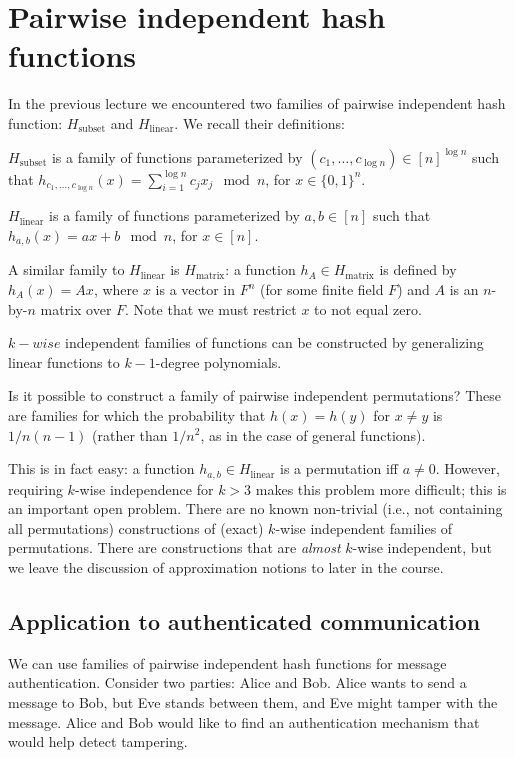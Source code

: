 \documentclass{article}
\begin{document}
\section{Pairwise independent hash functions}
In the previous lecture we encountered two families of pairwise
independent hash function: $H_{\mathrm{subset}}$ and
$H_{\mathrm{linear}}$. We recall their definitions:
\begin{definition}
  $H_{\mathrm{subset}}$ is a family of functions parameterized by
  $(c_1, \ldots, c_{\log n}) \in [n]^{\log n}$ such that $h_{c_1,
    \ldots, c_{\log n}}(x) = \sum_{i=1}^{\log n}c_jx_j \mod n$, for $x \in
    \{0,1\}^n$.
\end{definition}
\begin{definition}
  $H_{\mathrm{linear}}$ is a family of functions parameterized by
  $a,b \in [n]$ such that $h_{a,b}(x) = ax+b \mod n$, for $x \in [n]$.
\end{definition}

A similar family to $H_{\mathrm{linear}}$ is $H_{\mathrm{matrix}}$: a
function $h_A \in H_{\mathrm{matrix}}$ is defined by $h_A(x) = Ax$,
where $x$ is a vector in $F^n$ (for some finite field $F$) and $A$ is
an $n$-by-$n$ matrix over $F$. Note that we must restrict $x$ to not
equal zero.

$k-wise$ independent families of functions can be constructed by
generalizing linear functions to $k-1$-degree polynomials. 

Is it possible to construct a family of pairwise independent
permutations? These are families for which the probability that
$h(x)=h(y)$ for $x \neq y$ is $1/n(n-1)$ (rather than $1/n^2$, as in
the case of general functions).

This is in fact easy: a function $h_{a,b} \in H_{\mathrm{linear}}$ is
a permutation iff $a \neq 0$.  However, requiring $k$-wise
independence for $k>3$ makes this problem more difficult; this is an
important open problem. There are no known non-trivial (i.e., not
containing all permutations) constructions of (exact) $k$-wise
independent families of permutations.  There are constructions that
are {\em almost} $k$-wise independent, but we leave the discussion of
approximation notions to later in the course.

\subsection{Application to authenticated communication}
We can use families of pairwise independent hash functions for message
authentication. Consider two parties: Alice and Bob. Alice wants to
send a message to Bob, but Eve stands between them, and Eve might
tamper with the message. Alice and Bob would like to find an
authentication mechanism that would help detect tampering.
\end{document}
